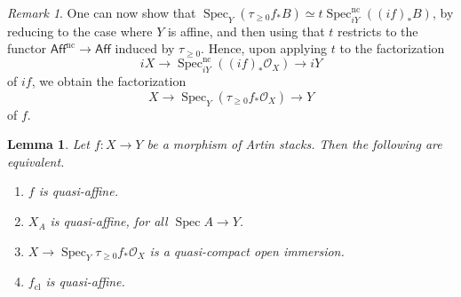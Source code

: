 \documentclass[a4paper,twoside,11pt]{amsart}
\theoremstyle{plain}
\newtheorem{lemma}[theorem]{Lemma}
\theoremstyle{definition}
\theoremstyle{remark}
\newtheorem{remark}[theorem]{Remark}
\numberwithin{equation}{section}
\newcommand{\nc}{\mathrm{nc}}
\newcommand{\Aff}{\mathsf{Aff}}
\DeclareMathOperator{\Spec}{Spec} %
\newcommand{\cl}{\mathrm{cl}} %
\newcommand{\oO}{\mathcal{O}}
\begin{document}
\begin{remark}
One can now show that $\Spec_Y(\tau_{\geq 0}f_*B) \simeq t \Spec^\nc_{iY}((if)_*B)$, by reducing to the case where $Y$ is affine, and then using that $t$ restricts to the functor $\Aff^\nc \to \Aff$ induced by $\tau_{\geq 0}$. Hence, upon applying $t$ to the factorization
\[ iX \to \Spec^\nc_{iY}((if)_*\oO_X) \to iY \]
of $if$, we obtain the factorization
\[ X \to \Spec_Y(\tau_{\geq 0}f_*\oO_X) \to Y \]
of $f$.
\end{remark}

\begin{lemma}
\label{Lem:qaffine_bc}
    Let $f \colon X \to Y$ be a morphism of Artin stacks. Then the following are equivalent.
    \begin{enumerate}
        \item $f$ is quasi-affine.
        \item $X_A$ is quasi-affine, for all $\Spec A \to Y$.
        \item $X \to \Spec_Y \tau_{\geq 0} f_* \oO_X$ is a quasi-compact open immersion.
        \item $f_\cl$ is quasi-affine.
    \end{enumerate}
\end{lemma}
\end{document}
